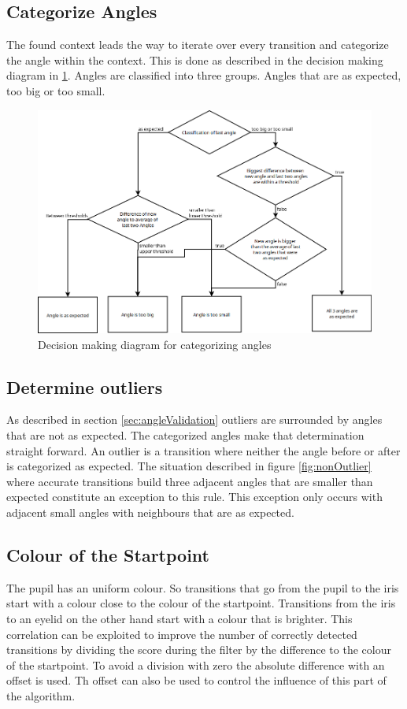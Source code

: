 \subsection{Categorize Angles}
The found context leads the way to iterate over every transition and categorize the angle within the context. This is done as described in the decision making diagram in \ref{fig:decisionMaking}. Angles are classified into three groups. Angles that are as expected, too big or too small. 

\begin{figure}[H]
	\centering
	\includegraphics[width=.9\linewidth]{images/angleclassification.png}
	\caption{Decision making diagram for categorizing angles}
	\label{fig:decisionMaking}
\end{figure}
\subsection{Determine outliers}
As described in section \ref{sec:angleValidation} outliers are surrounded by angles that are not as expected. The categorized angles make that determination straight forward. An outlier is a transition where neither the angle before or after is categorized as expected. 
The situation described in figure \ref{fig:nonOutlier} where accurate transitions build three adjacent angles that are smaller than expected constitute an exception to this rule. This exception only occurs with adjacent small angles with neighbours that are as expected. 
\subsection{Colour of the Startpoint}
\label{sec:colorStartpoint}
The pupil has an uniform colour. So transitions that go from the pupil to the iris start with a colour close to the colour of the startpoint. Transitions from the iris to an eyelid on the other hand start with a colour that is brighter. This correlation can be exploited to improve the number of correctly detected transitions by dividing the score during the filter by the difference to the colour of the startpoint. To avoid a division with zero the absolute difference with an offset is used. Th offset can also be used to control the influence of this part of the algorithm.  
